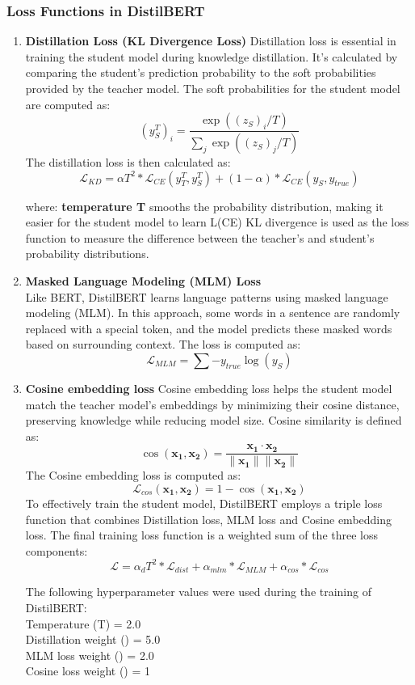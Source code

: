 \subsubsection{Loss Functions in DistilBERT}
\begin{enumerate}
    \item \textbf{Distillation Loss (KL Divergence Loss)}
    Distillation loss is essential in training the student model during knowledge distillation. It's calculated by comparing the student's prediction probability to the soft probabilities provided by the teacher model. The soft probabilities for the student model are computed as:\\
    \[
(y_S^T)_i = \frac{\exp((z_S)_i/T)}{\sum_j \exp((z_S)_j/T)}
\]
    The distillation loss is then calculated as:\\
    \[
\mathcal{L}_{KD} = \alpha T^2 * \mathcal{L}_{CE}(y_T^T, y_S^T) + (1 - \alpha) * \mathcal{L}_{CE}(y_S, y_{true})
\]

where:
\textbf{temperature T} smooths the probability distribution, making it easier for the student   model to learn
 	L(CE)  KL divergence is used as the loss function to measure the difference between the teacher’s and student’s probability distributions.
\item \textbf{Masked Language Modeling (MLM) Loss}\\
Like BERT, DistilBERT learns language patterns using masked language modeling (MLM). In this approach, some words in a sentence are randomly replaced with a special token, and the model predicts these masked words based on surrounding context. The loss is computed as:\\
\[
\mathcal{L}_{MLM} = \sum -y_{true} \log(y_S)
\]

\item \textbf{Cosine embedding loss}
Cosine embedding loss helps the student model match the teacher model’s embeddings by minimizing their cosine distance, preserving knowledge while reducing model size. Cosine similarity is defined as:\\
\[
\cos(\mathbf{x_1}, \mathbf{x_2}) = \frac{\mathbf{x_1} \cdot \mathbf{x_2}}{\|\mathbf{x_1}\| \|\mathbf{x_2}\|}
\]
The Cosine embedding loss is computed as:
\[
\mathcal{L}_{cos}(\mathbf{x_1}, \mathbf{x_2}) = 1 - \cos(\mathbf{x_1}, \mathbf{x_2})
\]
To effectively train the student model, DistilBERT employs a triple loss function that combines Distillation loss, MLM loss and Cosine embedding loss. The final training loss function is a weighted sum of the three loss components:\\
\[
\mathcal{L} = \alpha_d T^2 * \mathcal{L}_{dist} + \alpha_{mlm} * \mathcal{L}_{MLM} + \alpha_{cos} * \mathcal{L}_{cos}
\]

The following hyperparameter values were used during the training of DistilBERT:\\
Temperature (T) = 2.0\\
Distillation weight () = 5.0\\
MLM loss weight () = 2.0\\
Cosine loss weight () = 1\\


\end{enumerate}

